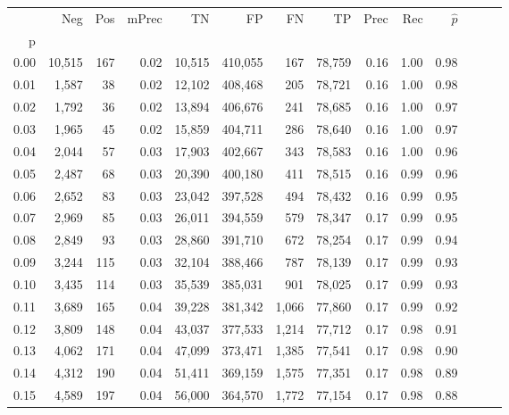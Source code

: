 \begin{tabular}{rrrrrrrrrrrrrr}
\toprule
{} &     Neg &    Pos & mPrec &       TN &       FP &      FN &      TP &  Prec &   Rec & $\hat{p}$ \\
p    &         &        &       &          &          &         &         &       &       &           \\
\midrule
0.00 &  10,515 &    167 &  0.02 &   10,515 &  410,055 &     167 &  78,759 &  0.16 &  1.00 &      0.98 \\
0.01 &   1,587 &     38 &  0.02 &   12,102 &  408,468 &     205 &  78,721 &  0.16 &  1.00 &      0.98 \\
0.02 &   1,792 &     36 &  0.02 &   13,894 &  406,676 &     241 &  78,685 &  0.16 &  1.00 &      0.97 \\
0.03 &   1,965 &     45 &  0.02 &   15,859 &  404,711 &     286 &  78,640 &  0.16 &  1.00 &      0.97 \\
0.04 &   2,044 &     57 &  0.03 &   17,903 &  402,667 &     343 &  78,583 &  0.16 &  1.00 &      0.96 \\
0.05 &   2,487 &     68 &  0.03 &   20,390 &  400,180 &     411 &  78,515 &  0.16 &  0.99 &      0.96 \\
0.06 &   2,652 &     83 &  0.03 &   23,042 &  397,528 &     494 &  78,432 &  0.16 &  0.99 &      0.95 \\
0.07 &   2,969 &     85 &  0.03 &   26,011 &  394,559 &     579 &  78,347 &  0.17 &  0.99 &      0.95 \\
0.08 &   2,849 &     93 &  0.03 &   28,860 &  391,710 &     672 &  78,254 &  0.17 &  0.99 &      0.94 \\
0.09 &   3,244 &    115 &  0.03 &   32,104 &  388,466 &     787 &  78,139 &  0.17 &  0.99 &      0.93 \\
0.10 &   3,435 &    114 &  0.03 &   35,539 &  385,031 &     901 &  78,025 &  0.17 &  0.99 &      0.93 \\
0.11 &   3,689 &    165 &  0.04 &   39,228 &  381,342 &   1,066 &  77,860 &  0.17 &  0.99 &      0.92 \\
0.12 &   3,809 &    148 &  0.04 &   43,037 &  377,533 &   1,214 &  77,712 &  0.17 &  0.98 &      0.91 \\
0.13 &   4,062 &    171 &  0.04 &   47,099 &  373,471 &   1,385 &  77,541 &  0.17 &  0.98 &      0.90 \\
0.14 &   4,312 &    190 &  0.04 &   51,411 &  369,159 &   1,575 &  77,351 &  0.17 &  0.98 &      0.89 \\
0.15 &   4,589 &    197 &  0.04 &   56,000 &  364,570 &   1,772 &  77,154 &  0.17 &  0.98 &      0.88 \\

\end{tabular}
